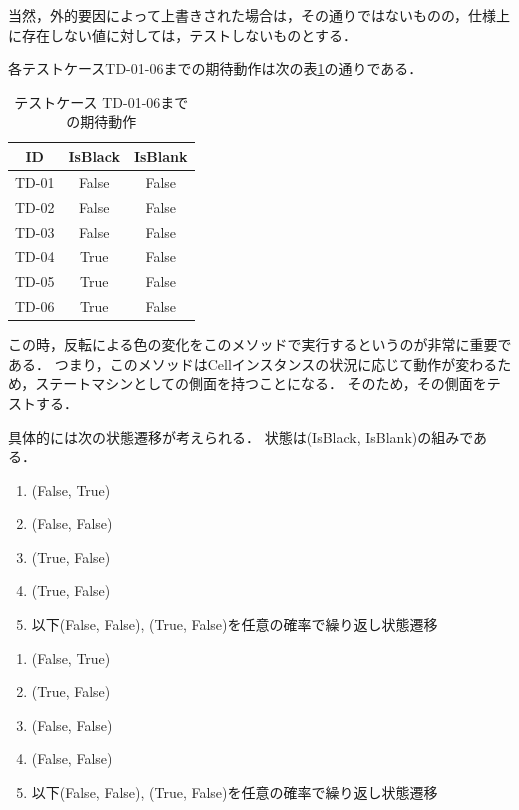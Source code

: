 \documentclass[platex,dvipdfmx,12pt]{jsarticle}
\begin{document}
当然，外的要因によって上書きされた場合は，その通りではないものの，仕様上に存在しない値に対しては，テストしないものとする．

各テストケースTD-01-06までの期待動作は次の表\ref{tab:enshu5-cell-set-exp}の通りである．

\begin{table}[H]
  \centering
  \caption{テストケース TD-01-06までの期待動作}
  \label{tab:enshu5-cell-set-exp}
  \begin{tabular}{ccc}
    ID & IsBlack & IsBlank \\
    \hline
    TD-01 & False & False \\
    TD-02 & False & False \\
    TD-03 & False & False \\
    TD-04 & True & False \\
    TD-05 & True & False \\
    TD-06 & True & False \\
  \end{tabular}
\end{table}

この時，反転による色の変化をこのメソッドで実行するというのが非常に重要である．
つまり，このメソッドはCellインスタンスの状況に応じて動作が変わるため，ステートマシンとしての側面を持つことになる．
そのため，その側面をテストする．

具体的には次の状態遷移が考えられる．
状態は(IsBlack, IsBlank)の組みである．

\begin{enumerate}
  \item (False, True)
  \item (False, False)
  \item (True, False)
  \item (True, False)
  \item 以下(False, False), (True, False)を任意の確率で繰り返し状態遷移
\end{enumerate}

\begin{enumerate}
  \item (False, True)
  \item (True, False)
  \item (False, False)
  \item (False, False)
  \item 以下(False, False), (True, False)を任意の確率で繰り返し状態遷移
\end{enumerate}
\end{document}
